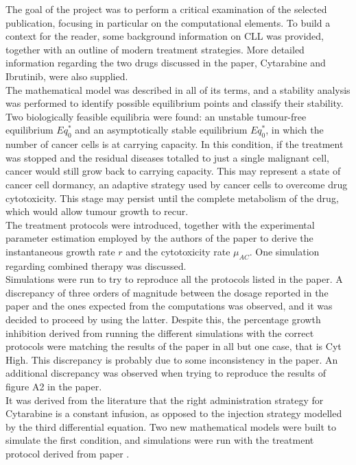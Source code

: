 The goal of the project was to perform a critical examination of the selected publication, focusing in particular on the computational elements. To build a context for the reader, some background information on CLL was provided, together with an outline of modern treatment strategies. More detailed information regarding the two drugs discussed in the paper, Cytarabine and Ibrutinib, were also supplied. \\
The mathematical model was described in all of its terms, and a stability analysis was performed to identify possible equilibrium points and classify their stability. Two biologically feasible equilibria were found: an unstable tumour-free equilibrium $Eq_{0}^{*}$ and an asymptotically stable equilibrium $Eq_{0}^{*}$, in which the number of cancer cells is at carrying capacity. In this condition, if the treatment was stopped and the residual diseases totalled to just a single malignant cell, cancer would still grow back to carrying capacity. This may represent a state of cancer cell dormancy, an adaptive strategy used by cancer cells to overcome drug cytotoxicity. This stage may persist until the complete metabolism of the drug, which would allow tumour growth to recur. \\
The treatment protocols were introduced, together with the experimental parameter estimation employed by the authors of the paper to derive the instantaneous growth rate $r$ and the cytotoxicity rate $\mu_{AC}$. One simulation regarding combined therapy was discussed. \\
Simulations were run to try to reproduce all the protocols listed in the paper. A discrepancy of three orders of magnitude between the dosage reported in the paper and the ones expected from the computations was observed, and it was decided to proceed by using the latter. Despite this, the percentage growth inhibition derived from running the different simulations with the correct protocols were matching the results of the paper in all but one case, that is Cyt High. This discrepancy is probably due to some inconsistency in the paper. An additional discrepancy was observed when trying to reproduce the results of figure A2 in the paper. \\ 
It was derived from the literature that the right administration strategy for Cytarabine is a constant infusion, as opposed to the injection strategy modelled by the third differential equation. Two new mathematical models were built to simulate the first condition, and simulations were run with the treatment protocol derived from paper \cite{cyt-3}. \\
